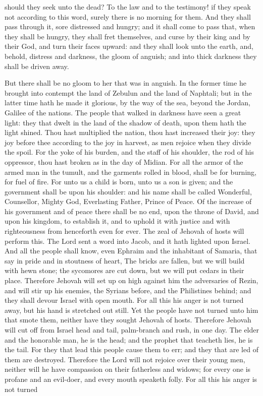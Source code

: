 should they seek unto the dead? To the law and to the testimony! if they speak not according to this word, surely there is no morning for them. And they shall pass through it, sore distressed and hungry; and it shall come to pass that, when they shall be hungry, they shall fret themselves, and curse by their king and by their God, and turn their faces upward: and they shall look unto the earth, and, behold, distress and darkness, the gloom of anguish; and into thick darkness they shall be driven away. 

But there shall be no gloom to her that was in anguish. In the former time he brought into contempt the land of Zebulun and the land of Naphtali; but in the latter time hath he made it glorious, by the way of the sea, beyond the Jordan, Galilee of the nations. The people that walked in darkness have seen a great light: they that dwelt in the land of the shadow of death, upon them hath the light shined. Thou hast multiplied the nation, thou hast increased their joy: they joy before thee according to the joy in harvest, as men rejoice when they divide the spoil. For the yoke of his burden, and the staff of his shoulder, the rod of his oppressor, thou hast broken as in the day of Midian. For all the armor of the armed man in the tumult, and the garments rolled in blood, shall be for burning, for fuel of fire. For unto us a child is born, unto us a son is given; and the government shall be upon his shoulder: and his name shall be called Wonderful, Counsellor, Mighty God, Everlasting Father, Prince of Peace. Of the increase of his government and of peace there shall be no end, upon the throne of David, and upon his kingdom, to establish it, and to uphold it with justice and with righteousness from henceforth even for ever. The zeal of Jehovah of hosts will perform this.  The Lord sent a word into Jacob, and it hath lighted upon Israel. And all the people shall know, even Ephraim and the inhabitant of Samaria, that say in pride and in stoutness of heart, The bricks are fallen, but we will build with hewn stone; the sycomores are cut down, but we will put cedars in their place. Therefore Jehovah will set up on high against him the adversaries of Rezin, and will stir up his enemies, the Syrians before, and the Philistines behind; and they shall devour Israel with open mouth. For all this his anger is not turned away, but his hand is stretched out still.  Yet the people have not turned unto him that smote them, neither have they sought Jehovah of hosts. Therefore Jehovah will cut off from Israel head and tail, palm-branch and rush, in one day. The elder and the honorable man, he is the head; and the prophet that teacheth lies, he is the tail. For they that lead this people cause them to err; and they that are led of them are destroyed. Therefore the Lord will not rejoice over their young men, neither will he have compassion on their fatherless and widows; for every one is profane and an evil-doer, and every mouth speaketh folly. For all this his anger is not turned 